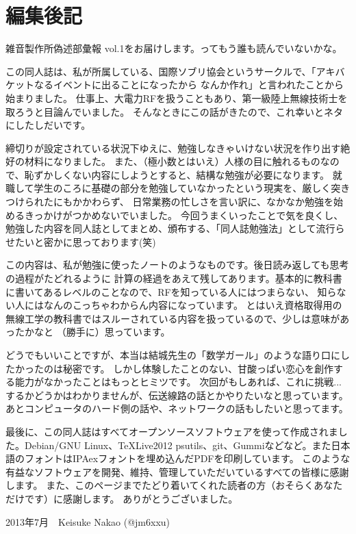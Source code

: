 \chapter*{編集後記}
雑音製作所偽述部彙報 vol.1をお届けします。ってもう誰も読んでいないかな。

この同人誌は、私が所属している、国際ソブリ協会というサークルで、「アキバケットなるイベントに出ることになったから
なんか作れ」と言われたことから始まりました。
仕事上、大電力RFを扱うこともあり、第一級陸上無線技術士を取ろうと目論んでいました。
そんなときにこの話がきたので、これ幸いとネタにしたしだいです。

締切りが設定されている状況下ゆえに、勉強しなきゃいけない状況を作り出す絶好の材料になりました。
また、（極小数とはいえ）人様の目に触れるものなので、恥ずかしくない内容にしようとすると、結構な勉強が必要になります。
就職して学生のころに基礎の部分を勉強していなかったという現実を、厳しく突きつけられたにもかかわらず、
日常業務の忙しさを言い訳に、なかなか勉強を始めるきっかけがつかめないでいました。
今回うまくいったことで気を良くし、勉強した内容を同人誌としてまとめ、頒布する、「同人誌勉強法」として流行らせたいと密かに思っております(笑)

この内容は、私が勉強に使ったノートのようなものです。後日読み返しても思考の過程がたどれるように
計算の経過をあえて残してあります。基本的に教科書に書いてあるレベルのことなので、RFを知っている人にはつまらない、
知らない人にはなんのこっちゃわからん内容になっています。
とはいえ資格取得用の無線工学の教科書ではスルーされている内容を扱っているので、少しは意味があったかなと
（勝手に）思っています。

どうでもいいことですが、本当は結城先生の「数学ガール」のような語り口にしたかったのは秘密です。
しかし体験したことのない、甘酸っぱい恋心を創作する能力がなかったことはもっとヒミツです。
次回がもしあれば、これに挑戦...するかどうかはわかりませんが、伝送線路の話とかやりたいなと思っています。
あとコンピュータのハード側の話や、ネットワークの話もしたいと思ってます。

最後に、この同人誌はすべてオープンソースソフトウェアを使って作成されました。Debian/GNU Linux、\TeX Live2012
psutils、git、Gummiなどなど。また日本語のフォントはIPAexフォントを埋め込んだPDFを印刷しています。
このような有益なソフトウェアを開発、維持、管理していただいているすべての皆様に感謝します。
また、このページまでたどり着いてくれた読者の方（おそらくあなただけです）に感謝します。
ありがとうございました。

\begin{flushright}
2013年7月　Keisuke Nakao (@jm6xxu) 
\end{flushright}

